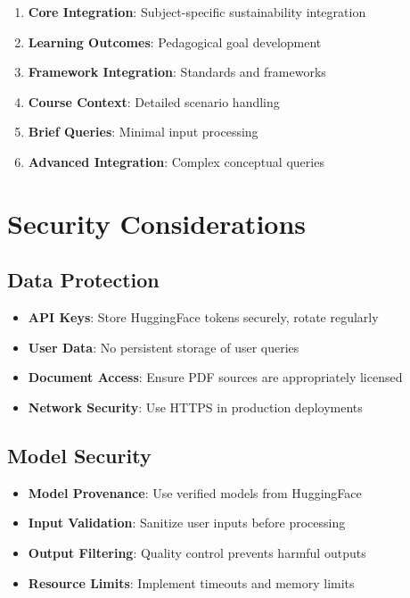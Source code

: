 \documentclass[12pt,a4paper]{article}
\begin{document}
\begin{enumerate}
    \item \textbf{Core Integration}: Subject-specific sustainability integration
    \item \textbf{Learning Outcomes}: Pedagogical goal development
    \item \textbf{Framework Integration}: Standards and frameworks
    \item \textbf{Course Context}: Detailed scenario handling
    \item \textbf{Brief Queries}: Minimal input processing
    \item \textbf{Advanced Integration}: Complex conceptual queries
\end{enumerate}

\section{Security Considerations}

\subsection{Data Protection}
\begin{itemize}
    \item \textbf{API Keys}: Store HuggingFace tokens securely, rotate regularly
    \item \textbf{User Data}: No persistent storage of user queries
    \item \textbf{Document Access}: Ensure PDF sources are appropriately licensed
    \item \textbf{Network Security}: Use HTTPS in production deployments
\end{itemize}

\subsection{Model Security}
\begin{itemize}
    \item \textbf{Model Provenance}: Use verified models from HuggingFace
    \item \textbf{Input Validation}: Sanitize user inputs before processing
    \item \textbf{Output Filtering}: Quality control prevents harmful outputs
    \item \textbf{Resource Limits}: Implement timeouts and memory limits
\end{itemize}
\end{document}
